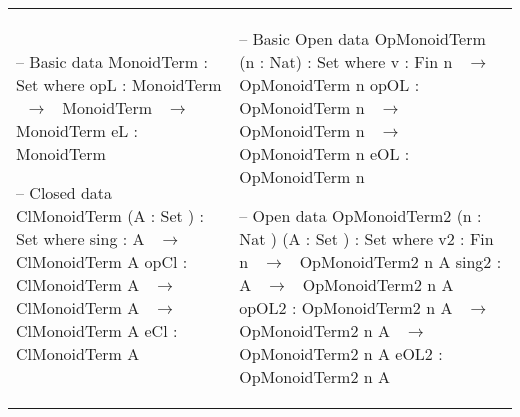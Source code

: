 \footnotesize
\begin{tabular}[t]{p{6.3cm} p{6.3cm}}
\begin{agdacode}
-- Basic 
data MonoidTerm  : Set where
  opL : MonoidTerm ~$\to$~ 
        MonoidTerm ~$\to$~ 
        MonoidTerm
  eL  : MonoidTerm   





-- Closed 
data ClMonoidTerm (A  : Set )  
          : Set where
  sing : A ~$\to$~ ClMonoidTerm A
  opCl : ClMonoidTerm A ~$\to$~ 
         ClMonoidTerm A ~$\to$~ 
         ClMonoidTerm A
  eCl : ClMonoidTerm A
  
  
    
\end{agdacode}
&
\begin{agdacode}
    
-- Basic Open 
data OpMonoidTerm (n  : Nat)  
          : Set where
  v : Fin n ~$\to$~ OpMonoidTerm n
  opOL : OpMonoidTerm n ~$\to$~ 
         OpMonoidTerm n ~$\to$~ 
         OpMonoidTerm n 
  eOL : OpMonoidTerm n  


-- Open
data OpMonoidTerm2 (n  : Nat ) (A  : Set )  
        : Set where
  v2 : Fin n ~$\to$~ OpMonoidTerm2 n A 
  sing2 : A ~$\to$~ OpMonoidTerm2 n A 
  opOL2 : OpMonoidTerm2 n A ~$\to$~ 
          OpMonoidTerm2 n A ~$\to$~ 
          OpMonoidTerm2 n A
  eOL2 : OpMonoidTerm2 n A  
\end{agdacode}
\end{tabular}